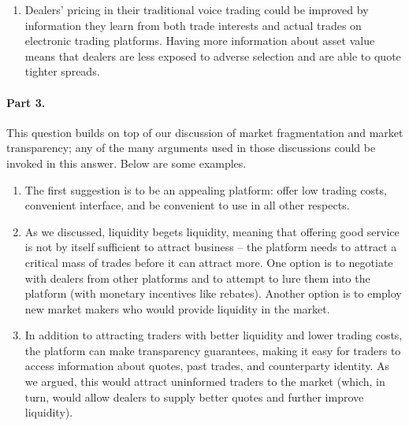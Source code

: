 \begin{solution}
\begin{enumerate}[label=(\alph{enumi})]
		\item Dealers’ pricing in their traditional voice trading could be improved by information they learn from both trade interests and actual trades on electronic trading platforms. Having more information about asset value means that dealers are less exposed to adverse selection and are able to quote tighter spreads.
	\end{enumerate}

	\paragraph{Part 3.} This question builds on top of our discussion of market fragmentation and market transparency; any of the many arguments used in those discussions could be invoked in this answer. Below are some examples.
	\begin{enumerate}[label=(\alph{enumi})]
		\item The first suggestion is to be an appealing platform: offer low trading costs, convenient interface, and be convenient to use in all other respects.
		
		\item As we discussed, liquidity begets liquidity, meaning that offering good service is not by itself sufficient to attract business -- the platform needs to attract a critical mass of trades before it can attract more. One option is to negotiate with dealers from other platforms and to attempt to lure them into the platform (with monetary incentives like rebates). Another option is to employ new market makers who would provide liquidity in the market.
		
		\item In addition to attracting traders with better liquidity and lower trading costs, the platform can make transparency guarantees, making it easy for traders to access information about quotes, past trades, and counterparty identity. As we argued, this would attract uninformed traders to the market (which, in turn, would allow dealers to supply better quotes and further improve liquidity).
	\end{enumerate}
	
	
\end{solution}
\ifprintanswers
{}
\fi 



%
%
%
%
%	


\fi